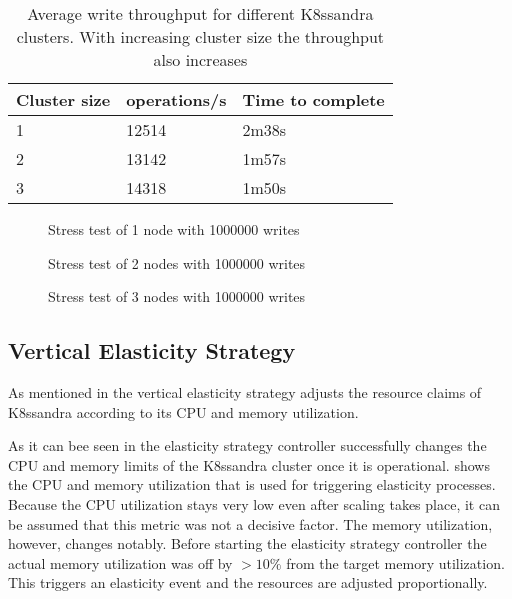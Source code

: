 \begin{table}[H]
\centering
\begin{tabular}{|l|l|l|}
\hline
\textbf{Cluster size} & \textbf{operations/s} & \textbf{Time to complete} \\ \hline
1                     & 12514                 & 2m38s                     \\ \hline
2                     & 13142                 & 1m57s                     \\ \hline
3                     & 14318                 & 1m50s                     \\ \hline
\end{tabular}
\caption{Average write throughput for different K8ssandra clusters. With increasing cluster size the throughput also increases}
\label{tab:stress-1000000writes-ops}
\end{table}

\begin{figure}
    \centering
    
    \caption{Stress test of 1 node with 1000000 writes}
    \label{fig:stress-1000000writes-1node}
\end{figure}

\begin{figure}
    \centering
    
    \caption{Stress test of 2 nodes with 1000000 writes}
    \label{fig:stress-1000000writes-2node}
\end{figure}

\begin{figure}
    \centering
    
    \caption{Stress test of 3 nodes with 1000000 writes}
    \label{fig:stress-1000000writes-3node}
\end{figure}

\subsection{Vertical Elasticity Strategy}
\label{sec:evaluation-vertical-elasticity}

As mentioned in  the vertical elasticity strategy adjusts the resource claims of K8ssandra according to its CPU and memory utilization.

As it can bee seen in  the elasticity strategy controller successfully changes the CPU and memory limits of the K8ssandra cluster once it is operational.  shows the CPU and memory utilization that is used for triggering elasticity processes. Because the CPU utilization stays very low even after scaling takes place, it can be assumed that this metric was not a decisive factor. The memory utilization, however, changes notably. Before starting the elasticity strategy controller the actual memory utilization was off by \(>10\%\) from the target memory utilization. This triggers an elasticity event and the resources are adjusted proportionally.

